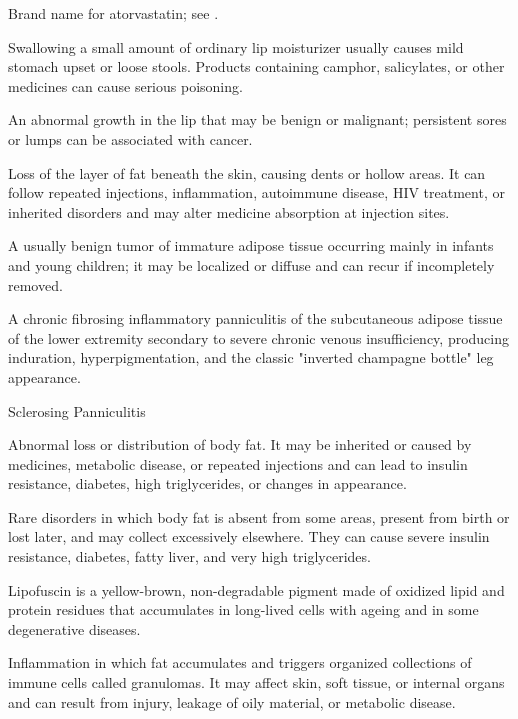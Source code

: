  Brand name for atorvastatin; see .

 Swallowing a small amount of ordinary lip moisturizer usually causes mild stomach upset or loose stools. Products containing camphor, salicylates, or other medicines can cause serious poisoning.

 An abnormal growth in the lip that may be benign or malignant; persistent sores or lumps can be associated with cancer.

 Loss of the layer of fat beneath the skin, causing dents or hollow areas. It can follow repeated injections, inflammation, autoimmune disease, HIV treatment, or inherited disorders and may alter medicine absorption at injection sites.

 A usually benign tumor of immature adipose tissue occurring mainly in infants and young children; it may be localized or diffuse and can recur if incompletely removed.

 A chronic fibrosing inflammatory panniculitis of the subcutaneous adipose tissue of the lower extremity secondary to severe chronic venous insufficiency, producing induration, hyperpigmentation, and the classic "inverted champagne bottle" leg appearance.

\synonyms
Sclerosing Panniculitis

 Abnormal loss or distribution of body fat. It may be inherited or caused by medicines, metabolic disease, or repeated injections and can lead to insulin resistance, diabetes, high triglycerides, or changes in appearance.

 Rare disorders in which body fat is absent from some areas, present from birth or lost later, and may collect excessively elsewhere. They can cause severe insulin resistance, diabetes, fatty liver, and very high triglycerides.

 Lipofuscin is a yellow-brown, non-degradable pigment made of oxidized lipid and protein residues that accumulates in long-lived cells with ageing and in some degenerative diseases.

 Inflammation in which fat accumulates and triggers organized collections of immune cells called granulomas. It may affect skin, soft tissue, or internal organs and can result from injury, leakage of oily material, or metabolic disease.

